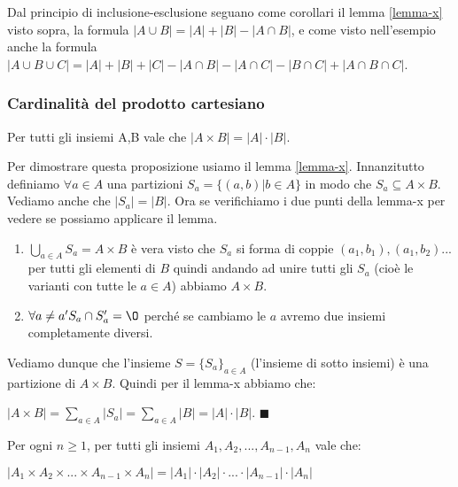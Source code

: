 \hspace{-15pt}Dal principio di inclusione-esclusione seguano come corollari il lemma \ref{lemma-x} visto sopra, la formula  $|A \cup B| = |A| + |B| - |A \cap B|$, e come visto nell'esempio anche la formula $|A \cup B \cup C| = |A| + |B| + |C| - |A\cap B| - |A\cap C| - |B \cap C| + |A \cap B \cap C|$.

\subsubsection{Cardinalità del prodotto cartesiano}
\begin{proposition}
Per tutti gli insiemi A,B vale che $|A \times B| = |A| \cdot |B|$.
\end{proposition}

\begin{demostration}
Per dimostrare questa proposizione usiamo il lemma \ref{lemma-x}. Innanzitutto definiamo $\forall a \in A$ una partizioni $S_a = \{(a,b) | b \in A\}$ in modo che $S_a \subseteq A \times B$. Vediamo anche che $|S_a| = |B|$. Ora se verifichiamo i due punti della lemma-x per vedere se possiamo applicare il lemma.
\begin{enumerate}
    \item $\bigcup\limits_{a \in A}S_a = A \times B$ è vera visto che $S_a$ si forma di coppie $(a_1, b_1), (a_1,b_2) ...$ per tutti gli elementi di $B$ quindi andando ad unire tutti gli $S_a$ (cioè le varianti con tutte le $a \in A$) abbiamo $A \times B$.
    \item $\forall a \neq a' S_a \cap S_a' = \O$ perché se cambiamo le $a$ avremo due insiemi completamente diversi.
\end{enumerate}
Vediamo dunque che l'insieme $S = \{S_a\}_{a \in A}$ (l'insieme di sotto insiemi)  è una partizione di $A \times B$. Quindi per il lemma-x abbiamo che:
\begin{center}
    $|A \times B| = \sum\limits_{a\in A}|S_a| = \sum\limits_{a \in A}|B| = |A| \cdot |B|$. $\blacksquare$
\end{center}
\end{demostration}

\begin{proposition}
Per ogni $n \geq 1$, per tutti gli insiemi $A_1, A_2, ...,A_{n-1}, A_{n}$ vale che:
\begin{center}
    $|A_1 \times A_2 \times ... \times A_{n-1} \times A_{n}| = |A_1| \cdot |A_2| \cdot ... \cdot |A_{n-1}| \cdot |A_{n}|$
\end{center}
\end{proposition}

